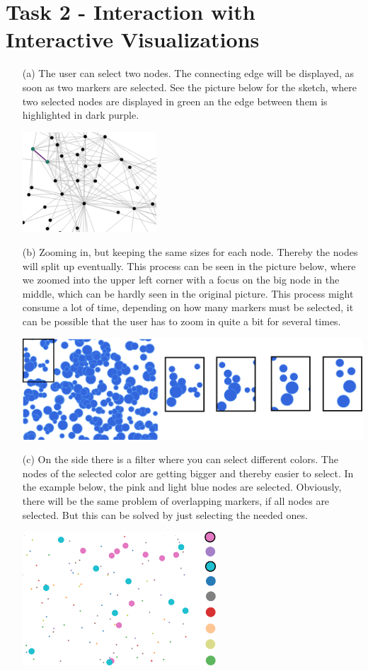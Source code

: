 \documentclass[a4paper]{article}
\begin{document}
\clearpage
\section*{Task 2 - Interaction with Interactive Visualizations}
\begin{enumerate}
	\item[(a)]The user can select two nodes. The connecting edge will be displayed, as soon as two markers are selected.
	See the picture below for the sketch, where two selected nodes are displayed in green an the edge between them is highlighted in dark purple.
	
	\includegraphics[width=5cm]{2a.png}
	
	\item[(b)]Zooming in, but keeping the same sizes for each node. Thereby the nodes will split up eventually. This process can be seen in the picture below, where we zoomed into the upper left corner with a focus on the big node in the middle, which can be hardly seen in the original picture.
	This process might consume a lot of time, depending on how many markers must be selected, it can be possible that the user has to zoom in quite a bit for several times. 
	
	\includegraphics[width=\linewidth]{2b.png}
	
	\item[(c)]On the side there is a filter where you can select different colors. 
	The nodes of the selected color are getting bigger and thereby easier to select. 
	In the example below, the pink and light blue nodes are selected. 
	Obviously, there will be the same problem of overlapping markers, if all nodes are selected. 
	But this can be solved by just selecting the needed ones. 
	
	\includegraphics[height=5cm]{2c2.png}
\end{enumerate}
\end{document}
